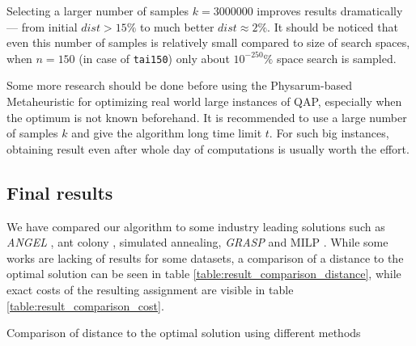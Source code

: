 Selecting a larger number of samples $k=3000000$ improves results dramatically --- from initial $dist>15\%$ to much better $dist{\approx}2\%$. It should be noticed that even this number of samples is relatively small compared to size of search spaces, when $n=150$ (in case of \texttt{tai150}) only about $10^{-250}\%$ space search is sampled.

Some more research should be done before using the Physarum-based Metaheuristic for optimizing real world large instances of QAP, especially when the optimum is not known beforehand. It is recommended to use a large number of samples $k$ and give the algorithm long time limit $t$. For such big instances, obtaining result even after whole day of computations is usually worth the effort.

\subsection{Final results}

We have compared our algorithm to some industry leading solutions such as \textit{ANGEL} \cite{tseng2006hybrid}, ant colony \cite{maniezzo1999ant}, simulated annealing, \textit{GRASP} and MILP \cite{karami2013analysis}. While some works are lacking of results for some datasets, a comparison of a distance to the optimal solution can be seen in table \ref{table:result_comparison_distance}, while exact costs of the resulting assignment are visible in table \ref{table:result_comparison_cost}.

\begin{table}
  \centering
  \caption{Comparison of distance to the optimal solution using different methods \cite{tseng2006hybrid, karami2013analysis, ramakrishnan1998tight, maniezzo1999ant}}
  \label{table:result_comparison_distance}

\end{table}

